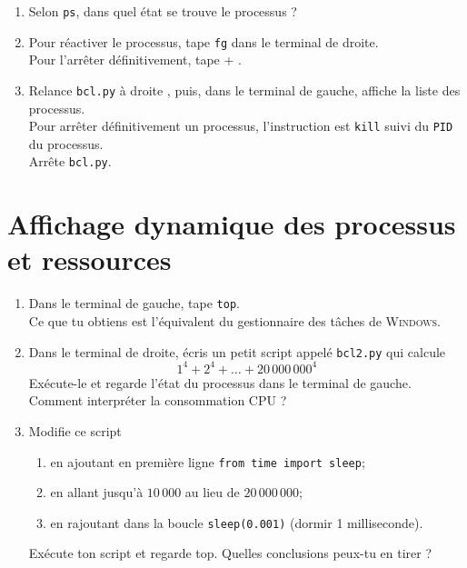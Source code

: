 \documentclass[a4paper,12pt,french]{book}
\begin{document}
\begin{enumerate}
    \item Selon \texttt{ps}, dans quel état se trouve le processus ?\\

    \item Pour réactiver le processus, tape \texttt{fg} dans le terminal de droite.\\
            Pour l'arrêter définitivement, tape  + .\\

    \item Relance \texttt{bcl.py} à droite , puis, dans le terminal de gauche, affiche la liste des processus.\\
          Pour arrêter définitivement un processus, l'instruction est \texttt{kill} suivi du \texttt{PID} du processus.\\
          Arrête \texttt{bcl.py}.
\end{enumerate}
\newpage
\section*{Affichage dynamique des processus et ressources}
\begin{enumerate}
	\item Dans le terminal de gauche, tape \texttt{top}.\\
     Ce que tu obtiens est l'équivalent du gestionnaire des tâches de \textsc{Windows}.\\

     \item Dans le terminal de droite, écris un petit script appelé \texttt{bcl2.py} qui calcule
     $$1^4+2^4+\ldots+20\,000\,000^4$$
     Exécute-le et regarde l'état du processus dans le terminal de gauche. Comment interpréter la consommation CPU ?\\

     \item Modifie ce script
     \begin{enumerate}[--]
     	\item en ajoutant en première ligne \texttt{from time import sleep};
         \item en allant jusqu'à $10\,000$ au lieu de $20\,000\,000$;
         \item en rajoutant dans la boucle \texttt{sleep(0.001)} (dormir 1 milliseconde).
     \end{enumerate}
     Exécute ton script et regarde top. Quelles conclusions peux-tu en tirer ?
\end{enumerate}
\end{document}
